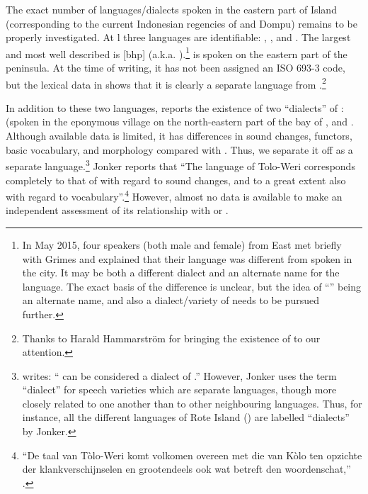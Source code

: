 The exact number of languages/dialects spoken in the eastern
part of  Island (corresponding to the current Indonesian
regencies of  and Dompu) remains to be properly investigated.
At l three languages are identifiable: , , and .
The largest and most well described is  [bhp] (a.k.a.
).\footnote{
		In May 2015, four  speakers (both male
		and female) from East  met briefly with Grimes
		and explained that their language was different from  spoken in the city.
		It may be both a different dialect
		and an alternate name for the language.
		The exact basis of the difference is unclear,
		but the idea of “” being an alternate name,
		and also a dialect/variety of  needs to be pursued further.}
 is spoken on the eastern part of the  peninsula.
At the time of writing,
it has not been assigned an ISO 693-3 code,
but the lexical data in \citet{Zollinger1850} shows that it is
clearly a separate language from .\footnote{
		Thanks to Harald Hammarström for bringing the existence of 
		to our attention.} 

In addition to these two languages,
\citet[3--4]{Jonker1896} reports the existence of two “dialects” of
:  (spoken in the eponymous village on the north-eastern
part of the bay of  \citep{PartamiKaryawan1995}, and .
Although available  data is limited,
it has differences in sound changes,
functors, basic vocabulary, and morphology compared with .
Thus, we separate it off as a separate language.\footnote{
		\citet[4]{Jonker1896}
		writes: “ can be considered a dialect of .” However,
		Jonker uses the term “dialect” for speech varieties which are
		separate languages, though more closely related to one another
		than to other neighbouring languages.
		Thus, for instance, all the different languages of Rote Island
		() are labelled “dialects” by Jonker.}
Jonker reports
that “The language of Tolo-Weri corresponds completely to that
of  with regard to sound changes,
and to a great extent also with regard to vocabulary”.\footnote{
“De
taal van Tòlo-Weri komt volkomen overeen met die van Kòlo ten
opzichte der klankverschijnselen en grootendeels ook wat betreft
den woordenschat,” \citep[4]{Jonker1896}.}
However,
almost no  data is available to make an independent
assessment of its relationship with  or .

